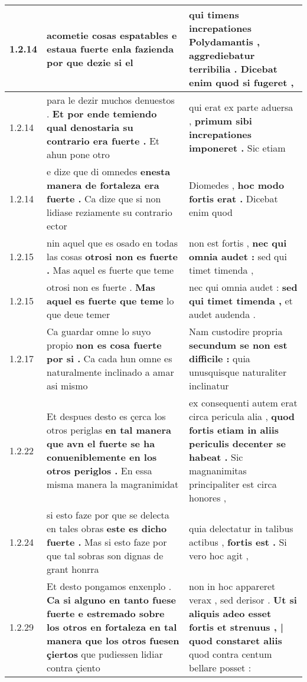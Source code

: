 \begin{tabular}{|p{1cm}|p{6.5cm}|p{6.5cm}|}
1.2.14 & acometie cosas espatables \textbf{ e estaua fuerte enla fazienda } por que dezie si el & qui timens increpationes Polydamantis , \textbf{ aggrediebatur terribilia . } Dicebat enim quod si fugeret , \\\hline
1.2.14 & para le dezir muchos denuestos . \textbf{ Et por ende temiendo qual denostaria su contrario era fuerte . } Et ahun pone otro & qui erat ex parte aduersa , \textbf{ primum sibi increpationes imponeret . } Sic etiam \\\hline
1.2.14 & e dize que di omnedes \textbf{ enesta manera de fortaleza era fuerte . } Ca dize que si non lidiase reziamente su contrario ector & Diomedes , \textbf{ hoc modo fortis erat . } Dicebat enim quod \\\hline
1.2.15 & nin aquel que es osado en todas las cosas \textbf{ otrosi non es fuerte . } Mas aquel es fuerte que teme & non est fortis , \textbf{ nec qui omnia audet : } sed qui timet timenda , \\\hline
1.2.15 & otrosi non es fuerte . \textbf{ Mas aquel es fuerte que teme } lo que deue temer & nec qui omnia audet : \textbf{ sed qui timet timenda , } et audet audenda . \\\hline
1.2.17 & Ca guardar omne lo suyo propio \textbf{ non es cosa fuerte por si . } Ca cada hun omne es naturalmente inclinado a amar asi mismo & Nam custodire propria \textbf{ secundum se non est difficile : } quia unusquisque naturaliter inclinatur \\\hline
1.2.22 & Et despues desto es çerca los otros periglas \textbf{ en tal manera que avn el fuerte se ha conueniblemente en los otros periglos . } En essa misma manera la magranimidat & ex consequenti autem erat circa pericula alia , \textbf{ quod fortis etiam in aliis periculis decenter se habeat . } Sic magnanimitas principaliter est circa honores , \\\hline
1.2.24 & si esto faze por que se delecta en tales obras \textbf{ este es dicho fuerte . } Mas si esto faze por que tal sobras son dignas de grant honrra & quia delectatur in talibus actibus , \textbf{ fortis est . } Si vero hoc agit , \\\hline
1.2.29 & Et desto pongamos enxenplo . \textbf{ Ca si alguno en tanto fuese fuerte e estremado sobre los otros en fortaleza en tal manera que los otros fuesen çiertos } que pudiessen lidiar contra çiento & non in hoc appareret verax , sed derisor . \textbf{ Ut si aliquis adeo esset fortis et strenuus , | quod constaret aliis } quod contra centum bellare posset : \\\hline

\end{tabular}
